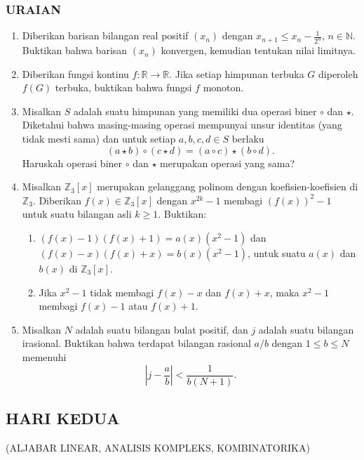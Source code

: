 \documentclass[12pt,twoside]{article}
\begin{document}
\subsubsection*{URAIAN}
\begin{enumerate}
	\item Diberikan barisan bilangan real positif $(x_n)$ dengan $x_{n+1} \leq x_n - \frac{1}{2^n}$, $n \in \mathbb{N}$. Buktikan bahwa barisan $(x_n)$ konvergen, kemudian tentukan nilai limitnya.

	\item Diberikan fungsi kontinu $f : \mathbb{R} \to \mathbb{R}$. Jika setiap himpunan terbuka $G$ diperoleh $f(G)$ terbuka, buktikan bahwa fungsi $f$ monoton.

	\item Misalkan $S$ adalah suatu himpunan yang memiliki dua operasi biner $\circ$ dan $\star$. Diketahui bahwa masing-masing operasi mempunyai unsur identitas (yang tidak mesti sama) dan untuk setiap $a, b, c, d \in S$ berlaku
	      \[
		      (a \star b) \circ (c \star d) = (a \circ c) \star (b \circ d).
	      \]
	      Haruskah operasi biner $\circ$ dan $\star$ merupakan operasi yang sama?

	\item Misalkan $\mathbb{Z}_3[x]$ merupakan gelanggang polinom dengan koefisien-koefisien di $\mathbb{Z}_3$. Diberikan $f(x) \in \mathbb{Z}_3[x]$ dengan $x^{2k} - 1$ membagi $(f(x))^2 - 1$ untuk suatu bilangan asli $k \geq 1$. Buktikan:
	      \begin{enumerate}
		      \item $(f(x) - 1)(f(x) + 1) = a(x) (x^2 - 1)$ dan $(f(x) - x)(f(x) + x) = b(x) (x^2 - 1)$, untuk suatu $a(x)$ dan $b(x)$ di $\mathbb{Z}_3[x]$.
		      \item Jika $x^2 - 1$ tidak membagi $f(x) - x$ dan $f(x) + x$, maka $x^2 - 1$ membagi $f(x) - 1$ atau $f(x) + 1$.
	      \end{enumerate}

	\item Misalkan $N$ adalah suatu bilangan bulat positif, dan $j$ adalah suatu bilangan irasional. Buktikan bahwa terdapat bilangan rasional $a/b$ dengan $1 \leq b \leq N$ memenuhi
	      \[
		      \left| j - \frac{a}{b} \right| < \frac{1}{b(N+1)}.
	      \]
\end{enumerate}
\newpage
\subsection{HARI KEDUA}
\begin{center}
	(ALJABAR LINEAR, ANALISIS KOMPLEKS, KOMBINATORIKA)
\end{center}
\end{document}
